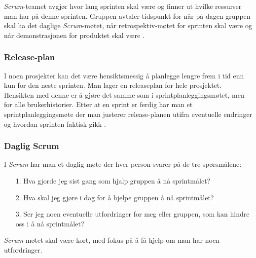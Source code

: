 \documentclass[12pt,a4paper,norsk]{article}
\begin{document}
    \textit{Scrum}-teamet avgjør hvor lang sprinten skal være og finner ut hvilke ressurser man har på denne sprinten. Gruppen avtaler tidspunkt for når på dagen gruppen skal ha det daglige \textit{Scrum}-møtet, når retrospektiv-møtet for sprinten skal være og når demonstrasjonen for produktet skal være \cite[side 16]{kniberg}.
	\subsubsection{Release-plan}
	I noen prosjekter kan det være hensiktsmessig å planlegge lengre frem i tid enn kun for den neste sprinten. Man lager en releaseplan for hele prosjektet. Hensikten med denne er å gjøre det samme som i sprintplanleggingsmøtet, men for alle brukerhistorier. Etter at en sprint er ferdig har man et sprintplanleggingsmøte der man justerer release-planen utifra eventuelle endringer og hvordan sprinten faktisk gikk \cite[side 95 - 101]{kniberg}.
	\subsubsection{Daglig Scrum}
	I \textit{Scrum} har man et daglig møte der hver person svarer på de tre spørsmålene:
	\begin{itemize}
    \item[1.] Hva gjorde jeg sist gang som hjalp gruppen å nå sprintmålet?
    \item[2.] Hva skal jeg gjøre i dag for å hjelpe gruppen å nå sprintmålet?
    \item[3.] Ser jeg noen eventuelle utfordringer for meg eller gruppen, som kan hindre oss i å nå sprintmålet?
    \end{itemize}
    \textit{Scrum}-møtet skal være kort, med fokus på å få hjelp om man har noen utfordringer.
\end{document}
